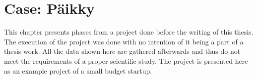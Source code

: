 
 \chapter{Case: Päikky}

This chapter presents phases from a project done before the writing of this thesis. The execution of the project was done with no intention of it being a part of a thesis work. All the data shown here are gathered afterwards and thus do not meet the requirements of a proper scientific study. The project is presented here as an example project of a small budget startup.




